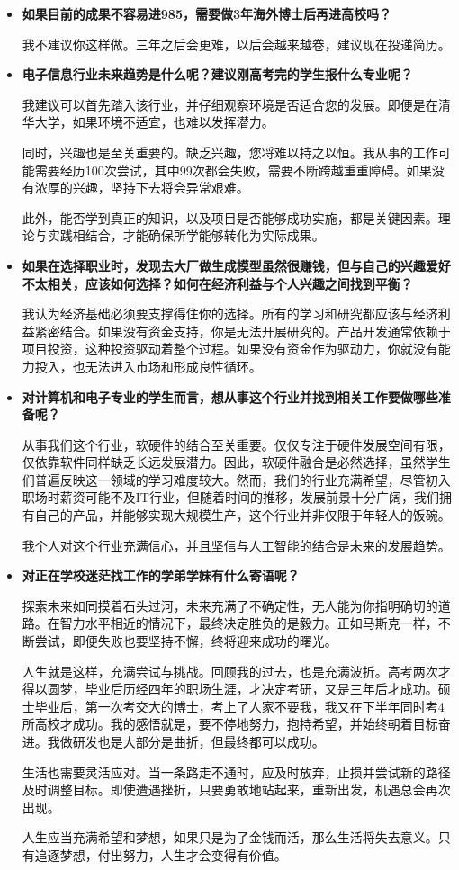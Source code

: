 \begin{itemize}
        \item \textbf{如果目前的成果不容易进985，需要做3年海外博士后再进高校吗？}

我不建议你这样做。三年之后会更难，以后会越来越卷，建议现在投递简历。

         \item \textbf{电子信息行业未来趋势是什么呢？建议刚高考完的学生报什么专业呢？}

我建议可以首先踏入该行业，并仔细观察环境是否适合您的发展。即便是在清华大学，如果环境不适宜，也难以发挥潜力。

同时，兴趣也是至关重要的。缺乏兴趣，您将难以持之以恒。我从事的工作可能需要经历100次尝试，其中99次都会失败，需要不断跨越重重障碍。如果没有浓厚的兴趣，坚持下去将会异常艰难。

此外，能否学到真正的知识，以及项目是否能够成功实施，都是关键因素。理论与实践相结合，才能确保所学能够转化为实际成果。


     \item \textbf{如果在选择职业时，发现去大厂做生成模型虽然很赚钱，但与自己的兴趣爱好不太相关，应该如何选择？如何在经济利益与个人兴趣之间找到平衡？}

我认为经济基础必须要支撑得住你的选择。所有的学习和研究都应该与经济利益紧密结合。如果没有资金支持，你是无法开展研究的。产品开发通常依赖于项目投资，这种投资驱动着整个过程。如果没有资金作为驱动力，你就没有能力投入，也无法进入市场和形成良性循环。

      \item \textbf{对计算机和电子专业的学生而言，想从事这个行业并找到相关工作要做哪些准备呢？}

从事我们这个行业，软硬件的结合至关重要。仅仅专注于硬件发展空间有限，仅依靠软件同样缺乏长远发展潜力。因此，软硬件融合是必然选择，虽然学生们普遍反映这一领域的学习难度较大。然而，我们的行业充满希望，尽管初入职场时薪资可能不及IT行业，但随着时间的推移，发展前景十分广阔，我们拥有自己的产品，并能够实现大规模生产，这个行业并非仅限于年轻人的饭碗。

我个人对这个行业充满信心，并且坚信与人工智能的结合是未来的发展趋势。


      \item \textbf{对正在学校迷茫找工作的学弟学妹有什么寄语呢？}

探索未来如同摸着石头过河，未来充满了不确定性，无人能为你指明确切的道路。在智力水平相近的情况下，最终决定胜负的是毅力。正如马斯克一样，不断尝试，即便失败也要坚持不懈，终将迎来成功的曙光。

人生就是这样，充满尝试与挑战。回顾我的过去，也是充满波折。高考两次才得以圆梦，毕业后历经四年的职场生涯，才决定考研，又是三年后才成功。硕士毕业后，第一次考交大的博士，考上了人家不要我，我又在下半年同时考4所高校才成功。我的感悟就是，要不停地努力，抱持希望，并始终朝着目标奋进。我做研发也是大部分是曲折，但最终都可以成功。

生活也需要灵活应对。当一条路走不通时，应及时放弃，止损并尝试新的路径及时调整目标。即使遭遇挫折，只要勇敢地站起来，重新出发，机遇总会再次出现。

人生应当充满希望和梦想，如果只是为了金钱而活，那么生活将失去意义。只有追逐梦想，付出努力，人生才会变得有价值。

\end{itemize}
